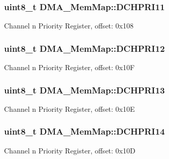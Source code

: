 \subsubsection[{D\+C\+H\+P\+R\+I11}]{\setlength{\rightskip}{0pt plus 5cm}uint8\+\_\+t D\+M\+A\+\_\+\+Mem\+Map\+::\+D\+C\+H\+P\+R\+I11}\label{struct_d_m_a___mem_map_ac88e35951301365fcf3ca39e3f75e018}
Channel n Priority Register, offset\+: 0x108 \hypertarget{struct_d_m_a___mem_map_a5dd1dc0a32b487c3c6aae50e585fa322}{}
\subsubsection[{D\+C\+H\+P\+R\+I12}]{\setlength{\rightskip}{0pt plus 5cm}uint8\+\_\+t D\+M\+A\+\_\+\+Mem\+Map\+::\+D\+C\+H\+P\+R\+I12}\label{struct_d_m_a___mem_map_a5dd1dc0a32b487c3c6aae50e585fa322}
Channel n Priority Register, offset\+: 0x10\+F \hypertarget{struct_d_m_a___mem_map_aa3206c803f93f959bf68730490eafeac}{}
\subsubsection[{D\+C\+H\+P\+R\+I13}]{\setlength{\rightskip}{0pt plus 5cm}uint8\+\_\+t D\+M\+A\+\_\+\+Mem\+Map\+::\+D\+C\+H\+P\+R\+I13}\label{struct_d_m_a___mem_map_aa3206c803f93f959bf68730490eafeac}
Channel n Priority Register, offset\+: 0x10\+E \hypertarget{struct_d_m_a___mem_map_af288b352870f7e17dc689a85477818c4}{}
\subsubsection[{D\+C\+H\+P\+R\+I14}]{\setlength{\rightskip}{0pt plus 5cm}uint8\+\_\+t D\+M\+A\+\_\+\+Mem\+Map\+::\+D\+C\+H\+P\+R\+I14}\label{struct_d_m_a___mem_map_af288b352870f7e17dc689a85477818c4}
Channel n Priority Register, offset\+: 0x10\+D \hypertarget{struct_d_m_a___mem_map_a7938c3c5e450351844c5c6630a5191b2}{}
